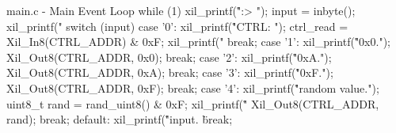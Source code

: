 \documentclass[../main.tex]{subfiles}
\begin{document}
\begin{myminted}{main.c - Main Event Loop}
while (1)
{
    xil_printf("\r\n\nCMD:> ");
    input = inbyte();
    xil_printf("%
    switch (input)
    {
        case '0':
            xil_printf("\r\nReading CTRL: ");
            ctrl_read = Xil_In8(CTRL_ADDR) & 0xF;
            xil_printf("%
            break;
        case '1':
            xil_printf("\r\nWriting 0x0.");
            Xil_Out8(CTRL_ADDR, 0x0);
            break;
        case '2':
            xil_printf("\r\nWriting 0xA.");
            Xil_Out8(CTRL_ADDR, 0xA);
            break;
        case '3':
            xil_printf("\r\nWriting 0xF.");
            Xil_Out8(CTRL_ADDR, 0xF);
            break;
        case '4':
            xil_printf("\r\nGenerating random value.");
            uint8_t rand = rand_uint8() & 0xF;
            xil_printf("\r\nWriting %
            Xil_Out8(CTRL_ADDR, rand);
            break;
        default:
            xil_printf("\r\nUnrecognized input. \"%
            break;
    }
}
\end{myminted}
\end{document}
